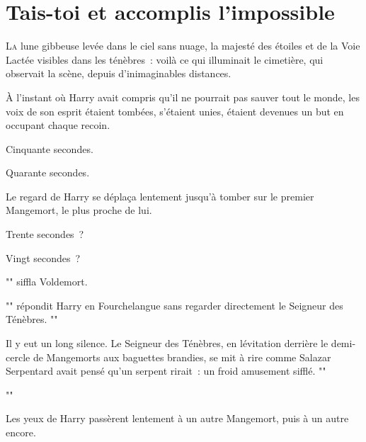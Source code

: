 \chapter{Tais-toi et accomplis l'impossible}

\lettrine{L}{a} lune gibbeuse levée dans le ciel sans nuage, la majesté des étoiles et de la Voie Lactée visibles dans les ténèbres~: voilà ce qui illuminait le cimetière, qui observait la scène, depuis d'inimaginables distances.

À l'instant où Harry avait compris qu'il ne pourrait pas sauver tout le monde, les voix de son esprit étaient tombées, s'étaient unies, étaient devenues un but en occupant chaque recoin.

Cinquante secondes.

Quarante secondes.

Le regard de Harry se déplaça lentement jusqu'à tomber sur le premier Mangemort, le plus proche de lui.

Trente secondes~?

Vingt secondes~?

"" siffla Voldemort.

"" répondit Harry en Fourchelangue sans regarder directement le Seigneur des Ténèbres. ""

Il y eut un long silence. Le Seigneur des Ténèbres, en lévitation derrière le demi-cercle de Mangemorts aux baguettes brandies, se mit à rire comme Salazar Serpentard avait pensé qu'un serpent rirait~: un froid amusement sifflé. ""

""

Les yeux de Harry passèrent lentement à un autre Mangemort, puis à un autre encore.

